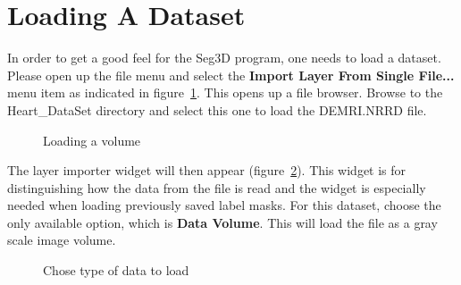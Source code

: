 \documentclass[fleqn,11pt,openany]{book}
\begin{document}
\section{Loading A Dataset}

In order to get a good feel for the Seg3D program, one needs to load a dataset. Please open up the file menu and select the {\bf Import Layer From Single File...} menu item as indicated in figure~\ref{fig:LoadVolume}. This opens up a file browser. Browse to the Heart\_DataSet directory and select this one to load the DEMRI.NRRD file.


\begin{figure}
\caption{Loading a volume}\label{fig:LoadVolume}
\end{figure}

The layer importer widget will then appear (figure~\ref{fig:LoadVolume_2}).  This widget is for distinguishing how the data from the file is read and the widget is especially needed when loading previously saved label masks.  For this dataset, choose the only available option, which is \textbf {Data Volume}.  This will load the file as a gray scale image volume.  

\begin{figure}
\caption{Chose type of data to load}\label{fig:LoadVolume_2}
\end{figure}
\end{document}
